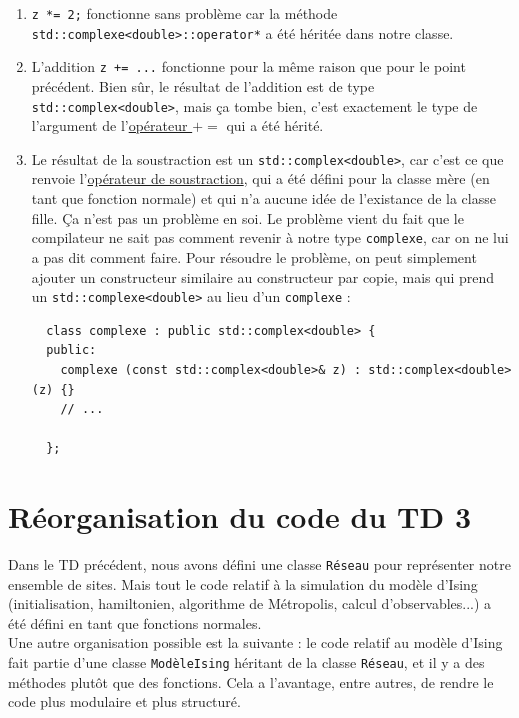 \documentclass{book}
\newcommand{\inline}[1]{\texttt{#1}}
\begin{document}
\begin{correction}
\begin{enumerate}
  \item \inline{z *= 2;} fonctionne sans problème car la méthode \inline{std::complexe<double>::operator*} a été héritée dans notre classe.

  \item L'addition \inline{z += ...} fonctionne pour la même raison que pour le point précédent. Bien sûr, le résultat de l'addition est de type \inline{std::complex<double>}, mais ça tombe bien, c'est exactement le type de l'argument de l'\href{https://en.cppreference.com/w/cpp/numeric/complex/operator_arith}{opérateur $+=$} qui a été hérité.

  \item Le résultat de la soustraction est un \inline{std::complex<double>}, car c'est ce que renvoie l'\href{https://en.cppreference.com/w/cpp/numeric/complex/operator_arith2}{opérateur de soustraction}, qui a été défini pour la classe mère (en tant que fonction normale) et qui n'a aucune idée de l'existance de la classe fille. Ça n'est pas un problème en soi. Le problème vient du fait que le compilateur ne sait pas comment revenir à notre type \inline{complexe}, car on ne lui a pas dit comment faire. Pour résoudre le problème, on peut simplement ajouter un constructeur similaire au constructeur par copie, mais qui prend un \inline{std::complexe<double>} au lieu d'un \inline{complexe} :
  \begin{verbatim}
  class complexe : public std::complex<double> {
  public:
    complexe (const std::complex<double>& z) : std::complex<double>(z) {}
    // ...

  };
  \end{verbatim}

\end{enumerate}

\end{correction}

\section{Réorganisation du code du TD 3}

Dans le TD précédent, nous avons défini une classe \inline{Réseau} pour représenter notre ensemble de sites. Mais tout le code relatif à la simulation du modèle d'Ising (initialisation, hamiltonien, algorithme de Métropolis, calcul d'observables...) a été défini en tant que fonctions normales.\\

Une autre organisation possible est la suivante : le code relatif au modèle d'Ising fait partie d'une classe \inline{ModèleIsing} héritant de la classe \inline{Réseau}, et il y a des méthodes plutôt que des fonctions. Cela a l'avantage, entre autres, de rendre le code plus modulaire et plus structuré.\\
\end{document}
